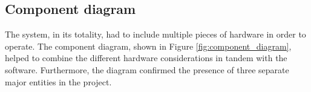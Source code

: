 \subsection{Component diagram}

\begin{figure}[h!]
\end{figure}

The system, in its totality, had to include multiple pieces of hardware in order to operate. The component diagram, shown in Figure \ref{fig:component_diagram}, helped to combine the different hardware considerations in tandem with the software. Furthermore, the diagram confirmed the presence of three separate major entities in the project.


